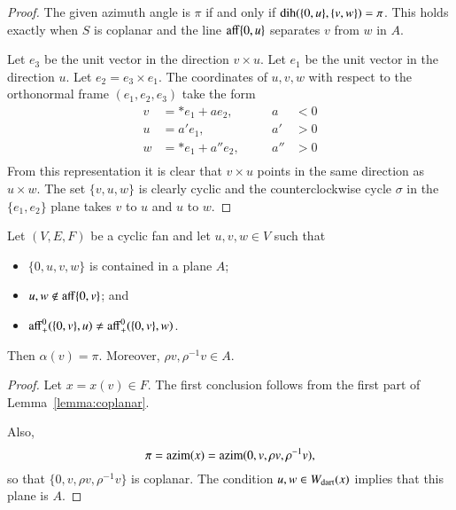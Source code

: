\begin{proof}  The given azimuth angle is $\pi$ if and only if $\operatorname{dih}(\{0,u\},\{v,w\})=\pi$.  This holds
exactly when $S$ is coplanar and the line ${\operatorname{aff}}\{0,u\}$ separates $v$ from $w$ in $A$.

Let $e_3$ be the unit vector in the direction $v\times u$.  Let $e_1$ be the unit vector in the direction $u$.
Let $e_2 = e_3 \times e_1$.  The coordinates of $u,v,w$ with respect to the orthonormal frame $(e_1,e_2,e_3)$ take the form
$$
\begin{array}{rllrl}
v &= * e_1 + a e_2,  &\quad & a &< 0\\
u &= a' e_1, &\quad & a' &>0\\
w&= * e_1 + a'' e_2, &\quad & a'' &>0\\
\end{array}
$$
From this representation it is clear that $v\times u$ points in the same direction as $u\times w$.
The set $\{v,u,w\}$ is clearly cyclic and the counterclockwise cycle $\sigma$ in the $\{e_1,e_2\}$ plane
takes $v$ to $u$ and $u$ to $w$.
\end{proof}

\begin{lemma} \label{lemma:A}  Let $(V,E,F)$ be a cyclic fan and let
$u,v,w\in V$ such that
\begin{itemize}
\item $\{0,u,v,w\}$ is contained in a plane $A$; \vspace{3pt}
\item $u,w\not\in{\operatorname{aff}}\{0,v\}$; and \vspace{3pt}
\item ${\operatorname{aff}}^0_+(\{0,v\},u) \ne {\operatorname{aff}}^0_+(\{0,v\},w)$.
\end{itemize}
Then $\alpha(v) = \pi$.  Moreover, $\rho v,\rho^{-1} v\in A$.
\end{lemma}

\begin{proof} Let $x = x(v)\in F$.  The first conclusion follows from the first part of Lemma~\ref{lemma:coplanar}.  

Also,
$$
\pi={\operatorname{azim}}(x) = {\operatorname{azim}}(0,v,\rho v,\rho^{-1}v),
$$
so that $\{0,v,\rho v,\rho^{-1} v\}$ is coplanar.  The condition
 $u,w\in W_{\text{dart}}(x)$ implies that this plane is $A$.
\end{proof}


